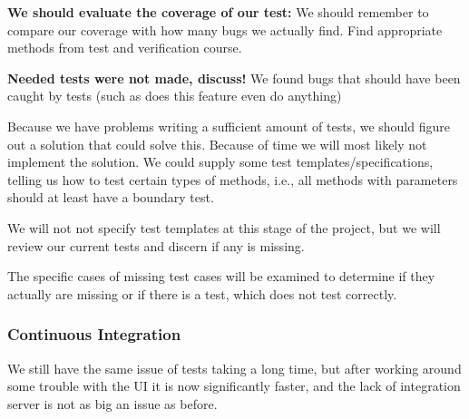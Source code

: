 \textbf{We should evaluate the coverage of our test:}
We should remember to compare our coverage with how many bugs we actually find.
Find appropriate methods from test and verification course.

\textbf{Needed tests were not made, discuss!}
We found bugs that should have been caught by tests (such as does this feature even do anything) 

Because we have problems writing a sufficient amount of tests, we should figure out a solution that could solve this. Because of time we will most likely not implement the solution. We could supply some test templates/specifications, telling us how to test certain types of methods, i.e., all methods with parameters should at least have a boundary test.

We will not not specify test templates at this stage of the project, but we will review our current tests and discern if any is missing.

The specific cases of missing test cases will be examined to determine if they actually are missing or if there is a test, which does not test correctly.


\subsubsection{Continuous Integration}
We still have the same issue of tests taking a long time, but after working around some trouble with the UI it is now significantly faster, and the lack of integration server is not as big an issue as before.